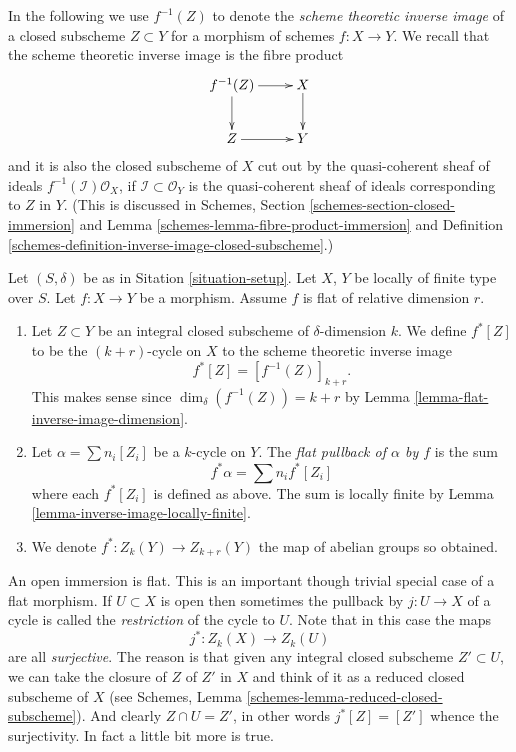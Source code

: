 \noindent
In the following we use $f^{-1}(Z)$ to denote the
{\it scheme theoretic inverse image} of a closed subscheme
$Z \subset Y$ for a morphism of schemes $f : X \to Y$.
We recall that the scheme theoretic inverse image is the fibre product
$$
\xymatrix{
f^{-1}(Z) \ar[r] \ar[d] & X \ar[d] \\
Z \ar[r] & Y
}
$$
and it is also the closed subscheme of $X$ cut out by the
quasi-coherent sheaf of ideals $f^{-1}(\mathcal{I})\mathcal{O}_X$, if
$\mathcal{I} \subset \mathcal{O}_Y$ is the quasi-coherent sheaf of ideals
corresponding to $Z$ in $Y$.
(This is discussed in
Schemes, Section \ref{schemes-section-closed-immersion} and
Lemma \ref{schemes-lemma-fibre-product-immersion}
and Definition \ref{schemes-definition-inverse-image-closed-subscheme}.)

\begin{definition}
\label{definition-flat-pullback}
Let $(S, \delta)$ be as in Sitation \ref{situation-setup}.
Let $X$, $Y$ be locally of finite type over $S$.
Let $f : X \to Y$ be a morphism.
Assume $f$ is flat of relative dimension $r$.
\begin{enumerate}
\item Let $Z \subset Y$ be an integral closed subscheme of
$\delta$-dimension $k$. We define $f^*[Z]$ to be the
$(k+r)$-cycle on $X$ to the scheme theoretic inverse image
$$
f^*[Z] = [f^{-1}(Z)]_{k+r}.
$$
This makes sense since $\dim_\delta(f^{-1}(Z)) = k + r$
by Lemma \ref{lemma-flat-inverse-image-dimension}.
\item Let $\alpha = \sum n_i [Z_i]$ be
a $k$-cycle on $Y$. The {\it flat pullback of $\alpha$ by $f$}
is the sum
$$
f^* \alpha = \sum n_i f^*[Z_i]
$$
where each $f^*[Z_i]$ is defined as above.
The sum is locally finite by Lemma \ref{lemma-inverse-image-locally-finite}.
\item We denote $f^* : Z_k(Y) \to Z_{k + r}(Y)$ the map of abelian
groups so obtained.
\end{enumerate}
\end{definition}

\noindent
An open immersion is flat. This is an important though trivial special
case of a flat morphism. If $U \subset X$ is open then sometimes the
pullback by $j : U \to X$ of a cycle is called the {\it restriction} of the
cycle to $U$. Note that in this case the maps
$$
j^* : Z_k(X) \longrightarrow Z_k(U)
$$
are all {\it surjective}. The reason is that given any integral closed
subscheme $Z' \subset U$, we can take the closure of $Z$ of $Z'$ in $X$
and think of it as a reduced closed subscheme of $X$ (see
Schemes, Lemma \ref{schemes-lemma-reduced-closed-subscheme}).
And clearly $Z \cap U = Z'$, in other words
$j^*[Z] = [Z']$ whence the surjectivity. In fact a little bit more
is true.

